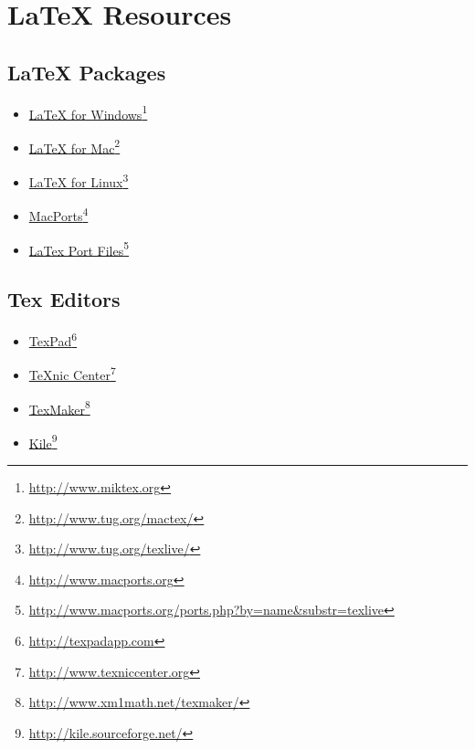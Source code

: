 
\section{LaTeX Resources}

\subsection{LaTeX Packages}
\label{latexpackages}

\begin{itemize}
\item \href{http://www.miktex.org}{LaTeX for Windows}\footnote{\href{http://www.miktex.org}{http:/\slash www.miktex.org}}

\item \href{http://www.tug.org/mactex/}{LaTeX for Mac}\footnote{\href{http://www.tug.org/mactex/}{http:/\slash www.tug.org\slash mactex\slash }}

\item \href{http://www.tug.org/texlive/}{LaTeX for Linux}\footnote{\href{http://www.tug.org/texlive/}{http:/\slash www.tug.org\slash texlive\slash }}

\item \href{http://www.macports.org}{MacPorts}\footnote{\href{http://www.macports.org}{http:/\slash www.macports.org}}

\item \href{http://www.macports.org/ports.php?by=name&substr=texlive}{LaTex Port Files}\footnote{\href{http://www.macports.org/ports.php?by=name&substr=texlive}{http:/\slash www.macports.org\slash ports.php?by=name\&substr=texlive}}

\end{itemize}

\subsection{Tex Editors}
\label{texeditor}

\begin{itemize}
\item \href{http://texpadapp.com}{TexPad}\footnote{\href{http://texpadapp.com}{http:/\slash texpadapp.com}}

\item \href{http://www.texniccenter.org}{TeXnic Center}\footnote{\href{http://www.texniccenter.org}{http:/\slash www.texniccenter.org}}

\item \href{http://www.xm1math.net/texmaker/}{TexMaker}\footnote{\href{http://www.xm1math.net/texmaker/}{http:/\slash www.xm1math.net\slash texmaker\slash}}

\item \href{http://kile.sourceforge.net/}{Kile}\footnote{\href{http://kile.sourceforge.net/}{http:/\slash kile.sourceforge.net\slash}}

\end{itemize}

